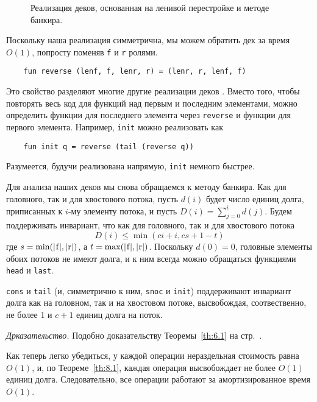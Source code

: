 \begin{figure}
  \centering
  
  \caption{Реализация деков, основанная на ленивой перестройке и методе банкира.}
  \label{fig:8.3}
\end{figure}

\begin{remark}
  Поскольку наша реализация симметрична, мы можем обратить дек за
  время $O(1)$, попросту поменяв \lstinline!f! и \lstinline!r! ролями.
  \begin{lstlisting}
    fun reverse (lenf, f, lenr, r) = (lenr, r, lenf, f)
  \end{lstlisting}
  Это свойство разделяют многие другие реализации деков
  \cite{Hoogerwoord1992, ChuangGoldberg1993}. Вместо того, чтобы
  повторять весь код для функций над первым и последним элементами,
  можно определить функции для последнего элемента через
  \lstinline!reverse! и функции для первого элемента. Например,
  \lstinline!init! можно реализовать как
  \begin{lstlisting}
    fun init q = reverse (tail (reverse q))
  \end{lstlisting}
  Разумеется, будучи реализована напрямую, \lstinline!init! немного быстрее.
\end{remark}

Для анализа наших деков мы снова обращаемся к методу банкира. Как для
головного, так и для хвостового потока, пусть $d(i)$ будет число
единиц долга, приписанных к $i$-му элементу потока, и пусть 
$D(i) = \sum_{j=0}^i d(j)$. Будем поддерживать инвариант, что как для
головного, так и для хвостового потока
$$
D(i) \le \min(ci + i, cs + 1 - t)
$$
где $s = \min(|\lstinline!f!|,|\lstinline!r!|)$, а 
$t = \max(|\lstinline!f!|, |\lstinline!r!|)$. Поскольку $d(0) = 0$,
головные элементы обоих потоков не имеют долга, и к ним всегда
можно обращаться функциями \lstinline!head! и \lstinline!last!.
\begin{theorem}\label{th:8.1}
  \lstinline!cons! и \lstinline!tail! (и, симметрично к ним,
  \lstinline!snoc! и \lstinline!init!) поддерживают инвариант долга
  как на головном, так и на хвостовом потоке, высвобождая,
  соотвественно, не более 1 и $c+1$ единиц долга на поток.

  \emph{Дрказательство.} Подобно доказательству Теоремы~\ref{th:6.1}
  на стр.~\pageref{th:6.1}.
\end{theorem}

Как теперь легко убедиться, у каждой операции нераздельная стоимость
равна $O(1)$, и, по Теореме~\ref{th:8.1}, каждая операция высвобождает
не более $O(1)$ единиц долга. Следовательно, все операции работают за
амортизированное время $O(1)$.

